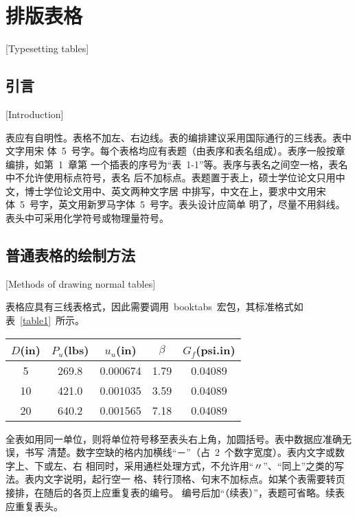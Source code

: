 
\chapter{排版表格}[Typesetting tables]

\section{引言}[Introduction]

表应有自明性。表格不加左、右边线。表的编排建议采用国际通行的三线表。表中文字用宋
体~5~号字。每个表格均应有表题（由表序和表名组成）。表序一般按章编排，如第~1~章第
一个插表的序号为“表~1-1”等。表序与表名之间空一格，表名中不允许使用标点符号，表名
后不加标点。表题置于表上，硕士学位论文只用中文，博士学位论文用中、英文两种文字居
中排写，中文在上，要求中文用宋体~5~号字，英文用新罗马字体~5~号字。表头设计应简单
明了，尽量不用斜线。表头中可采用化学符号或物理量符号。

\section{普通表格的绘制方法}[Methods of drawing normal tables]

表格应具有三线表格式，因此需要调用~booktabs~宏包，其标准格式如表~\ref{table1}~所示。
\begin{table}[htbp]
	\vspace{0.5em}\centering\wuhao
	\begin{tabular}{ccccc}
		\toprule[1.5pt]
		$D$(in) & $P_u$(lbs) & $u_u$(in) & $\beta$ & $G_f$(psi.in) \\
		\midrule[1pt]
		5       & 269.8      & 0.000674  & 1.79    & 0.04089       \\
		10      & 421.0      & 0.001035  & 3.59    & 0.04089       \\
		20      & 640.2      & 0.001565  & 7.18    & 0.04089       \\
		\bottomrule[1.5pt]
	\end{tabular}
\end{table}
全表如用同一单位，则将单位符号移至表头右上角，加圆括号。表中数据应准确无误，书写
清楚。数字空缺的格内加横线“－”（占~2~个数字宽度）。表内文字或数字上、下或左、右
相同时，采用通栏处理方式，不允许用“〃”、“同上”之类的写法。表内文字说明，起行空一
格、转行顶格、句末不加标点。如某个表需要转页接排，在随后的各页上应重复表的编号。
编号后加“（续表）”，表题可省略。续表应重复表头。

